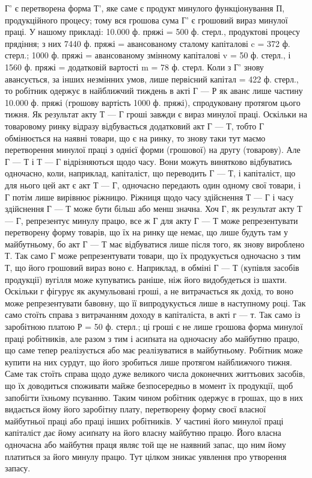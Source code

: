 Г' є перетворена форма Т', яке саме є продукт минулого функціонування
П, продукційного процесу; тому вся грошова сума Г' є грошовий
вираз минулої праці. У нашому прикладі: 10.000 ф. пряжі = 500 ф. стерл.,
продуктові процесу прядіння; з них 7440 ф. пряжі = авансованому
сталому капіталові c = 372 ф. стерл.; 1000 ф. пряжі = авансованому
змінному капіталові v = 50 ф. стерл., і 1560 ф. пряжі = додатковій
вартості m = 78 ф. стерл. Коли з Г' знову авансується, за інших незмінних
умов, лише первісний капітал = 422 ф. стерл., то робітник одержує
в найближчий тиждень в акті Г — Р як аванс лише частину 10.000 ф.
пряжі (грошову вартість 1000 ф. пряжі), спродуковану протягом цього
тижня. Як результат акту Т — Г гроші завжди є вираз минулої праці.
Оскільки на товаровому ринку відразу відбувається додатковий акт Г — Т,
тобто Г обмінюється на наявні товари, що є на ринку, то знову таки
тут маємо перетворення минулої праці з однієї форми (грошової) на
другу (товарову). Але Г — Т і Т — Г відрізняються щодо часу. Вони
можуть винятково відбуватись одночасно, коли, наприклад, капіталіст,
що переводить Г — Т, і капіталіст, що для нього цей акт є акт
Т — Г, одночасно передають один одному свої товари, і Г потім лише
вирівнює ріжницю. Ріжниця щодо часу здійснення Т — Г і часу здійснення
Г — Т може бути більш або менш значна. Хоч Г, як результат акту
Т — Г, репрезентує минулу працю, все ж Г для акту Г — Т може
репрезентувати перетворену форму товарів, що їх на ринку ще немає,
що лише будуть там у майбутньому, бо акт Г — Т має відбуватися
лише після того, як знову вироблено Т. Так само Г може
репрезентувати товари, що їх продукується одночасно з тим Т, що його
грошовий вираз воно є. Наприклад, в обміні Г — Т (купівля засобів
продукції) вугілля може купуватись раніше, ніж його видобудеться із
шахти. Оскільки г фігурує як акумульовані гроші, а не витрачається
як дохід, то воно може репрезентувати бавовну, що її випродукується
лише в наступному році. Так само стоїть справа з витрачанням доходу
в капіталіста, в акті г — т. Так само із заробітною платою Р = 50 ф.
стерл.; ці гроші є не лише грошова форма минулої праці робітників, але
разом з тим і асиґната на одночасну або майбутню працю, що
саме тепер реалізується або має реалізуватися в майбутньому. Робітник
може купити на них сурдут, що його зробиться лише протягом найближчого
тижня. Саме так стоїть справа щодо дуже великого числа доконечних
життьових засобів, що їх доводиться споживати майже безпосередньо в
момент їх продукції, щоб запобігти їхньому псуванню. Таким чином
робітник одержує в грошах, що в них видається йому його заробітну плату,
перетворену форму своєї власної майбутньої праці або праці інших робітників.
У частині його минулої праці капіталіст дає йому асиґнату на його
власну майбутню працю. Його власна одночасна або майбутня праця
являє той ще не наявний запас, що ним йому платиться за його минулу
працю. Тут цілком зникає уявлення про утворення запасу.

